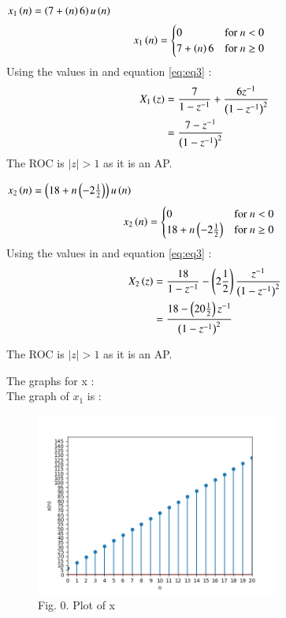 \documentclass[journal,12pt,twocolumn]{IEEEtran}
\theoremstyle{remark}
\begin{document}
$x_{1}\left(n\right) = \left(7 + \left(n\right)6\right)u\left(n\right)$
\begin{align}
     x_{1}\left(n\right) & = \begin{cases} 
        0 & \text{for } n < 0 \\
        7 + \left(n\right)6 & \text{for } n \geq 0
    \end{cases}
\end{align}
Using the values in  and equation \eqref{eq:eq3} :
\begin{align}
X_{1}\left(z\right) &= \frac{7}{1 - z^{-1}} + \frac{6z^{-1}}{\left(1 - z^{-1}\right)^2}\\
 &= \frac{7 - z^{-1}}{\left(1-z^{-1}\right)^2}
 \end{align}
 The ROC is $|z|>1$ as it is an AP.
 
\textbf{}

$x_{2}\left(n\right) = \left(18 + n\left(-2\frac{1}{2}\right)\right)u\left(n\right)$\\
\begin{align}
     x_{2}\left(n\right) & = \begin{cases}
        0 & \text{for } n < 0 \\
        18 + n\left(-2\frac{1}{2}\right) & \text{for } n \geq 0
    \end{cases}
 \end{align}
Using the values in  and equation \eqref{eq:eq3} :
\begin{align} 
X_{2}\left(z\right) &=  \frac{18}{1 - z^{-1}} - \left(2\frac{1}{2}\right)\frac{z^{-1}}{\left(1-z^{-1}\right)^2}\\
&= \frac{18 - \left(20\frac{1}{2}\right)z^{-1}}{\left(1 - z^{-1}\right)^2}
\end{align}

The ROC is $|z|>1$ as it is an AP.

\newpage
The graphs for x : \\
\large\textbf{} \normalsize The graph of $x_{1}$ is :
\begin{figure}[ht]
    \begin{center}
    \includegraphics[width = 8cm]{Figure_1}\\
    Fig. 0. Plot of x \\
    \end{center}
\end{figure}
\end{document}
